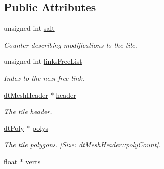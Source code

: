 \subsection*{Public Attributes}
\begin{DoxyCompactItemize}
\item 
\mbox{\label{structdtMeshTile_a21bccdc0f5d778d886eaa5aae72b400f}} 
unsigned int \hyperlink{structdtMeshTile_a21bccdc0f5d778d886eaa5aae72b400f}{salt}
\begin{DoxyCompactList}\small\item\em Counter describing modifications to the tile. \end{DoxyCompactList}\item 
\mbox{\label{structdtMeshTile_ad010d9daba37865a4065248745e0b4a0}} 
unsigned int \hyperlink{structdtMeshTile_ad010d9daba37865a4065248745e0b4a0}{links\+Free\+List}
\begin{DoxyCompactList}\small\item\em Index to the next free link. \end{DoxyCompactList}\item 
\mbox{\label{structdtMeshTile_accb1f3b391dd3c27b4de024500d4091f}} 
\hyperlink{structdtMeshHeader}{dt\+Mesh\+Header} $\ast$ \hyperlink{structdtMeshTile_accb1f3b391dd3c27b4de024500d4091f}{header}
\begin{DoxyCompactList}\small\item\em The tile header. \end{DoxyCompactList}\item 
\mbox{\label{structdtMeshTile_a52b180ac0cb2067c84f1f71d91ae53ca}} 
\hyperlink{structdtPoly}{dt\+Poly} $\ast$ \hyperlink{structdtMeshTile_a52b180ac0cb2067c84f1f71d91ae53ca}{polys}
\begin{DoxyCompactList}\small\item\em The tile polygons. \mbox{[}\hyperlink{classSize}{Size}\+: \hyperlink{structdtMeshHeader_ab36d94238505dbf5370c69c8e5276d74}{dt\+Mesh\+Header\+::poly\+Count}\mbox{]}. \end{DoxyCompactList}\item 
\mbox{\label{structdtMeshTile_a60f96b0153e3e8ef689f29ef03d61321}} 
float $\ast$ \hyperlink{structdtMeshTile_a60f96b0153e3e8ef689f29ef03d61321}{verts}

\end{DoxyCompactItemize}
